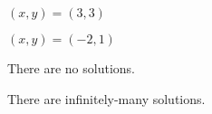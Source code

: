 \begin{readinessAssuranceTest}
\begin{multicols}{4}
\begin{readinessAssuranceTestChoices}
\item
\((x,y)=(3,3)\)
\item
\((x,y)=(-2,1)\)
\item There are no solutions.
\item There are infinitely-many solutions. %
\end{readinessAssuranceTestChoices}
\end{multicols}

\end{readinessAssuranceTest}
